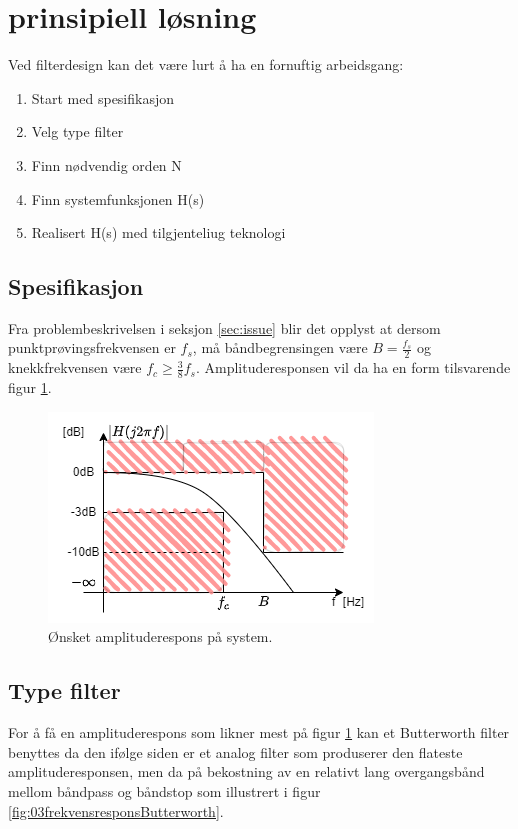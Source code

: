 \section{prinsipiell løsning}
\label{sec:concept}

Ved filterdesign kan det være lurt å ha en fornuftig arbeidsgang:
\begin{enumerate}
    \item Start med spesifikasjon
    \item Velg type filter
    \item Finn nødvendig orden N
    \item Finn systemfunksjonen H(s)
    \item Realisert H(s) med tilgjenteliug teknologi
  \end{enumerate}

\subsection{Spesifikasjon}
\label{sec:spesifikasjon}
Fra problembeskrivelsen i seksjon \ref{sec:issue} blir det opplyst at dersom punktprøvingsfrekvensen er $f_s$, må båndbegrensingen være $B=\frac {f_s} {2}$ og knekkfrekvensen være $f_c \geq \frac{3}{8}f_s$. Amplituderesponsen vil da ha en form tilsvarende figur \ref{fig:02ønsketamplituderespons}.

\begin{figure}[!hbt]
	\centering
	\includegraphics[scale=0.7]{./Images/02Concept/01spesifikasjon.png}
	\caption{Ønsket amplituderespons på system.}
	\label{fig:02ønsketamplituderespons}
\end{figure}

\subsection{Type filter}
\label{sec:type_filter}

For å få en amplituderespons som likner mest på figur \ref{fig:02ønsketamplituderespons} kan et Butterworth filter benyttes da den ifølge siden \cite{storr_2013_butterworth} er et analog filter som produserer den flateste amplituderesponsen, men da på bekostning av en relativt lang overgangsbånd mellom båndpass og båndstop som illustrert i figur \ref{fig:03frekvensresponsButterworth}. 

